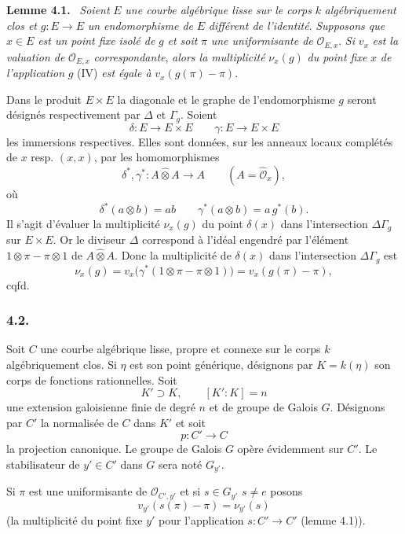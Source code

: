 \documentclass[11pt]{article}
\newenvironment{statement}[1]{\par\medskip\noindent\textbf{#1.}\ }{\par\medskip}
\begin{document}
\begin{statement}{Lemme 4.1}
\emph{Soient} $E$ \emph{une courbe algébrique lisse sur le corps} $k$ \emph{algébriquement clos et} $g:E\to E$ \emph{un endomorphisme de} $E$ \emph{différent de l'identité}. \emph{Supposons que} $x\in E$ \emph{est un point fixe isolé de} $g$ \emph{et soit} $\pi$ \emph{une uniformisante de} $\mathcal O_{E,x}$. \emph{Si} $v_x$ \emph{est la valuation de} $\mathcal O_{E,x}$ \emph{correspondante}, \emph{alors la multiplicité} $\nu_x(g)$ \emph{du point fixe} $x$ \emph{de l'application} $g$ (IV) \emph{est égale à} $v_x(g(\pi)-\pi)$.
\end{statement}


Dans le produit $E\times E$ la diagonale et le graphe de l'endomorphisme $g$ seront désignés respectivement par $\Delta$ et $\Gamma_g$. Soient
\[
\delta:E\longrightarrow E\times E\qquad
\gamma:E\longrightarrow E\times E
\]
les immersions respectives. Elles sont données, sur les anneaux locaux complétés de $x$ resp. $(x,x)$, par les homomorphismes
\[
\delta^*,\gamma^*:A\widehat\otimes A\longrightarrow A
\qquad (A=\widehat{\mathcal O}_x),
\]
où
\[
\delta^*(a\otimes b)=ab\qquad
\gamma^*(a\otimes b)=a\,g^*(b).
\]
Il s'agit d'évaluer la multiplicité $\nu_x(g)$ du point $\delta(x)$ dans l'intersection $\Delta\Gamma_g$ sur $E\times E$. Or le diviseur $\Delta$ correspond à l'idéal engendré par l'élément $1\otimes\pi-\pi\otimes1$ de $A\widehat\otimes A$. Donc la multiplicité de $\delta(x)$ dans l'intersection $\Delta\Gamma_g$ est
\[
\nu_x(g)=v_x\bigl(\gamma^*(1\otimes\pi-\pi\otimes1)\bigr)
      =v_x(g(\pi)-\pi),
\]
cqfd.

\subsubsection*{4.2.}

Soit $C$ une courbe algébrique lisse, propre et connexe sur le corps $k$ algébriquement clos. Si $\eta$ est son point générique, désignons par $K=k(\eta)$ son corps de fonctions rationnelles.
Soit
\[
K'\supset K,\qquad [K':K]=n
\]
une extension galoisienne finie de degré $n$ et de groupe de Galois $G$. Désignons par $C'$ la normalisée de $C$ dans $K'$ et soit
\[
p:C'\longrightarrow C
\]
la
projection canonique. Le groupe de Galois $G$ opère évidemment sur $C'$. Le stabilisateur de $y'\in C'$ dans $G$ sera noté $G_{y'}$.

Si $\pi$ est une uniformisante de $\mathcal O_{C',y'}$ et si $s\in G_{y'}$ $s\ne e$ posons
\[
v_{y'}(s(\pi)-\pi)=\nu_{y'}(s)
\tag{4.2.1}
\]
(la multiplicité du point fixe $y'$ pour l'application $s:C'\to C'$ (lemme 4.1)).%
\end{document}

